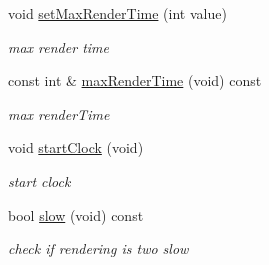 \begin{DoxyCompactItemize}
\mbox{\label{class_transition_data_aeb5d3a534944a4037c84996279146836}} 
void \hyperlink{class_transition_data_aeb5d3a534944a4037c84996279146836}{set\+Max\+Render\+Time} (int value)
\begin{DoxyCompactList}\small\item\em max render time \end{DoxyCompactList}\item 
\mbox{\label{class_transition_data_ae6c17565bd530270cad39c5747d4526b}} 
const int \& \hyperlink{class_transition_data_ae6c17565bd530270cad39c5747d4526b}{max\+Render\+Time} (void) const
\begin{DoxyCompactList}\small\item\em max render\+Time \end{DoxyCompactList}\item 
\mbox{\label{class_transition_data_a5d93a020c6b42768e8745c6d4864418c}} 
void \hyperlink{class_transition_data_a5d93a020c6b42768e8745c6d4864418c}{start\+Clock} (void)
\begin{DoxyCompactList}\small\item\em start clock \end{DoxyCompactList}\item 
\mbox{\label{class_transition_data_ada6e6abdea2a803369d3d17b30aca685}} 
bool \hyperlink{class_transition_data_ada6e6abdea2a803369d3d17b30aca685}{slow} (void) const
\begin{DoxyCompactList}\small\item\em check if rendering is two slow \end{DoxyCompactList}\end{DoxyCompactItemize}
